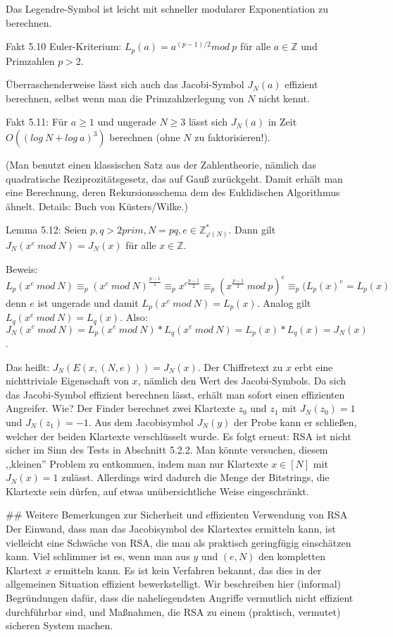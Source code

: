 \documentclass[a4paper]{article}
\begin{document}
\begin{multicols}{3}
{{{{Das Legendre-Symbol ist leicht mit schneller modularer Exponentiation zu berechnen.

Fakt 5.10 Euler-Kriterium: $L_p(a) =a^{(p-1)/ 2}mod\ p$ für alle $a\in\mathbb{Z}$ und Primzahlen $p>2$. 

Überraschenderweise lässt sich auch das Jacobi-Symbol $J_N(a)$ effizient berechnen, selbst wenn man die Primzahlzerlegung von $N$ nicht kennt.

Fakt 5.11: Für $a\geq 1$ und ungerade $N\geq 3$ lässt sich $J_N(a)$ in Zeit $O((log\ N+log\ a)^3)$ berechnen (ohne $N$ zu faktorisieren!).

(Man benutzt einen klassischen Satz aus der Zahlentheorie, nämlich das quadratische Reziprozitätsgesetz, das auf Gauß zurückgeht. Damit erhält man eine Berechnung, deren Rekursionsschema dem des Euklidischen Algorithmus ähnelt. Details: Buch von Küsters/Wilke.)

Lemma 5.12: Seien $p,q >2 prim,N=pq,e\in\mathbb{Z}^*_{\varphi(N)}$. Dann gilt $J_N(x^e\ mod\ N) =J_N(x)$ für alle $x\in\mathbb{Z}$.

Beweis: $L_p(x^e\ mod\ N)\equiv_p (x^e\ mod\ N)^{\frac{p-1}{2}} \equiv_p x^{e\frac{p-1}{2}} \equiv_p (x^{\frac{p-1}{2}}\ mod\ p)^e \equiv_p (L_p(x)^e =L_p(x)$
denn $e$ ist ungerade und damit $L_p(x^e\ mod\ N) =L_p(x)$. Analog gilt $L_q(x^e\ mod\ N) =L_q(x)$.
Also: $J_N(x^e\ mod\ N) =L_p(x^e\ mod\ N)*L_q(x^e\ mod\ N) =L_p(x)*L_q(x) =J_N(x)$.

Das heißt: $J_N(E(x,(N,e))) =J_N(x)$. Der Chiffretext zu $x$ erbt eine nichttriviale Eigenschaft von $x$, nämlich den Wert des Jacobi-Symbols. Da sich das Jacobi-Symbol effizient berechnen lässt, erhält man sofort einen effizienten Angreifer. Wie? Der Finder berechnet zwei Klartexte $z_0$ und $z_1$ mit $J_N(z_0) = 1$ und $J_N(z_1) = -1$. Aus dem Jacobisymbol $J_N(y)$ der Probe kann er schließen, welcher der beiden Klartexte verschlüsselt wurde. Es folgt erneut: RSA ist nicht sicher im Sinn des Tests in Abschnitt 5.2.2.
Man könnte versuchen, diesem ,,kleinen'' Problem zu entkommen, indem man nur Klartexte $x\in [N]$ mit $J_N(x) = 1$ zulässt. Allerdings wird dadurch die Menge der Bitstrings, die Klartexte sein dürfen, auf etwas unübersichtliche Weise eingeschränkt.


## Weitere Bemerkungen zur Sicherheit und effizienten Verwendung von RSA
Der Einwand, dass man das Jacobisymbol des Klartextes ermitteln kann, ist vielleicht eine Schwäche von RSA, die man als praktisch geringfügig einschätzen kann. Viel schlimmer ist es, wenn man aus $y$ und $(e,N)$ den kompletten Klartext $x$ ermitteln kann. Es ist kein Verfahren bekannt, das dies in der allgemeinen Situation effizient bewerkstelligt. Wir beschreiben hier (informal) Begründungen dafür, dass die naheliegendsten Angriffe vermutlich nicht effizient durchführbar sind, und Maßnahmen, die RSA zu einem (praktisch, vermutet) sicheren System machen.

}}}}
\end{multicols}
\end{document}
